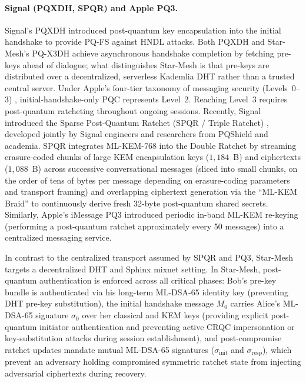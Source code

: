 \documentclass[11pt,a4paper]{article}
\theoremstyle{remark}
\theoremstyle{plain}
\begin{document}
\paragraph{Signal (PQXDH, SPQR) and Apple PQ3.}
Signal's PQXDH \cite{signal_pqxdh} introduced post-quantum key encapsulation into the initial
handshake to provide PQ-FS against HNDL attacks.  Both PQXDH and Star-Mesh's PQ-X3DH achieve
asynchronous handshake completion by fetching pre-keys ahead of dialogue; what distinguishes
Star-Mesh is that pre-keys are distributed over a decentralized, serverless Kademlia DHT rather than
a trusted central server.  Under Apple's four-tier taxonomy of messaging security
(Levels~0--3) \cite{imessage_pq3}, initial-handshake-only PQC represents Level~2.  Reaching Level~3
requires post-quantum ratcheting throughout ongoing sessions.  Recently, Signal introduced the
Sparse Post-Quantum Ratchet (SPQR / Triple Ratchet) \cite{signal_spqr,dodis2025tripleratchet,auerbach2025compare}, developed jointly by Signal engineers and researchers from PQShield and academia.  SPQR integrates ML-KEM-768 into the Double Ratchet by streaming erasure-coded chunks of large KEM encapsulation keys ($1{,}184$~B) and ciphertexts ($1{,}088$~B) across successive conversational messages (sliced into small chunks, on the order of tens of bytes per message depending on erasure-coding parameters and transport framing) and overlapping ciphertext generation via the ``ML-KEM Braid'' to continuously derive fresh 32-byte post-quantum shared secrets.  Similarly,
Apple's iMessage PQ3 \cite{imessage_pq3} introduced periodic in-band ML-KEM re-keying (performing a post-quantum ratchet approximately every 50 messages) into a
centralized messaging service.

In contrast to the centralized transport assumed by SPQR and PQ3, Star-Mesh targets a decentralized
DHT and Sphinx mixnet setting.  In Star-Mesh, post-quantum authentication is enforced across all critical phases:
Bob's pre-key bundle is authenticated via his long-term ML-DSA-65 identity key (preventing DHT pre-key substitution),
the initial handshake message $M_0$ carries Alice's ML-DSA-65 signature $\sigma_0$ over her classical and KEM keys
(providing explicit post-quantum initiator authentication and preventing active CRQC impersonation or key-substitution attacks during session establishment),
and post-compromise ratchet updates mandate mutual ML-DSA-65 signatures ($\sigma_{\mathrm{init}}$ and $\sigma_{\mathrm{resp}}$),
which prevent an adversary holding compromised symmetric ratchet state from injecting adversarial ciphertexts during recovery.
\end{document}
